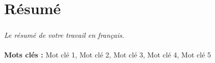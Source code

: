 
\chapter*{Résumé}

\paragraph{}
\textit{Le résumé de votre travail en français.} \\[0.5cm]
\lipsum[1-2] \\
\textbf{Mots clés :} Mot clé 1, Mot clé 2, Mot clé 3, Mot clé 4, Mot clé 5

